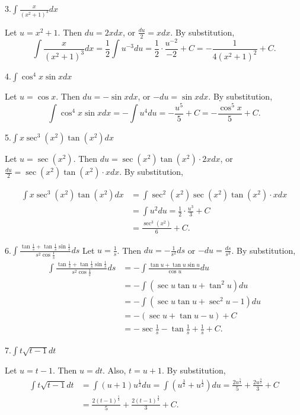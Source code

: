 \documentclass[
  letterpaper,
  DIV=11,
  numbers=noendperiod]{scrartcl}
\begin{document}
3.\(\int \frac{x}{\left(x^2+1\right)^3} dx\)

Let \(u=x^2+1\). Then \(du=2xdx\), or \(\frac{du}{2}=xdx\). By
substitution, \[
\int \frac{x}{\left(x^2+1\right)^3}dx=\frac{1}{2}\int u^{-3}du=\frac{1}{2}\cdot \frac{u^{-2}}{-2}+C=-\frac{1}{4\left(x^2+1\right)^2}+C.
\]

4.\(\int \cos^4 x \sin xdx\)

Let \(u=\cos x\). Then \(du=-\sin x dx\), or \(-du=\sin xdx\). By
substitution, \[
\int \cos^4 x \sin xdx=-\int u^4 du=-\frac{u^5}{5}+C=-\frac{\cos^5 x}{5}+C.
\]

5.\(\int x \sec^3 \left( x^2 \right)\tan\left(x^2\right)dx\)

Let \(u=\sec\left (x^2\right)\). Then
\(du=\sec\left(x^2\right)\tan\left(x^2\right)\cdot 2xdx\), or
\(\frac{du}{2}=\sec\left (x^2\right)\tan\left(x^2\right)\cdot xdx\). By
substitution,

\[
\begin{aligned}
\int x\sec^3 \left(x^2\right)\tan\left(x^2\right)dx &= \int \sec^2 \left(x^2\right)\sec\left(x^2\right)\tan\left(x^2\right)\cdot xdx \\ &= \int u^2du=\frac{1}{2}\cdot \frac{u^3}{3}+C \\& = \frac{\sec^3 \left(x^2\right)}{6} + C.
\end{aligned}
\]

6.\(\int \frac{\tan\frac{1}{s}+\tan\frac{1}{s}\sin\frac{1}{s}}{s^2\cos\frac{1}{s}}ds\)
Let \(u=\frac{1}{s}\). Then \(du=-\frac{1}{s^2}ds\) or
\(-du=\frac{ds}{s^2}\). By substitution, \[
\begin{aligned}
\int \frac{\tan\frac{1}{s}+\tan\frac{1}{s}\sin\frac{1}{s}}{s^2\cos\frac{1}{s}}ds &= -\int \frac{\tan u+\tan u \sin u}{\cos u}du\\&=-\int (\sec u \tan u + \tan^2 u)du\\&=-\int (\sec u \tan u +\sec^2 u -1 )du\\&=-(\sec u +\tan u-u) + C\\&=-\sec\frac{1}{s}-\tan\frac{1}{s}+\frac{1}{s}+C.  
\end{aligned}
\]

7.\(\int t\sqrt {t-1} dt\)

Let \(u=t-1\). Then \(u=dt\). Also, \(t=u+1\). By substitution,
\[ \begin{aligned}
\int t\sqrt{t-1} dt &=\int \left(u+1\right)u^\frac{1}{2}du =\int \left( u^\frac{3}{2}+u^\frac{1}{2} \right)du =\frac{2u^\frac{5}{2}}{5}+\frac{2u^\frac{3}{2}}{3}+C\\&=\frac{2\left(t-1\right)^\frac{5}{2}}{5}+\frac{2\left(t-1\right)^\frac{3}{2}}{3}+C.
\end{aligned}
\]
\end{document}
